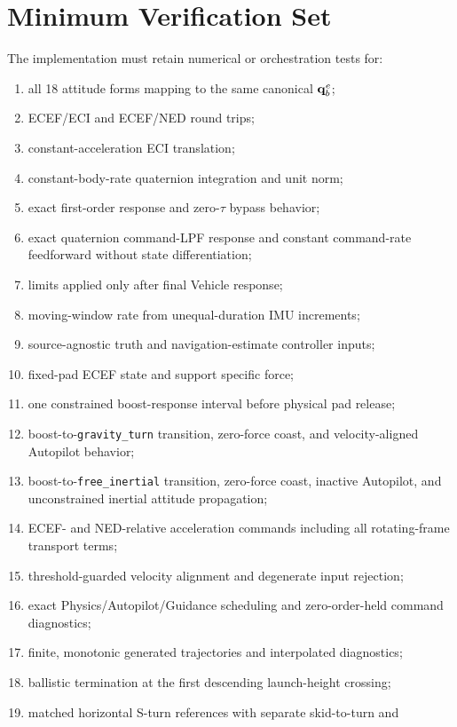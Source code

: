 \section{Minimum Verification Set}

The implementation must retain numerical or orchestration tests for:
\begin{enumerate}
    \item all 18 attitude forms mapping to the same canonical $\mathbf{q}_b^e$;
    \item ECEF/ECI and ECEF/NED round trips;
    \item constant-acceleration ECI translation;
    \item constant-body-rate quaternion integration and unit norm;
    \item exact first-order response and zero-$\tau$ bypass behavior;
    \item exact quaternion command-LPF response and constant command-rate
          feedforward without state differentiation;
    \item limits applied only after final Vehicle response;
    \item moving-window rate from unequal-duration IMU increments;
    \item source-agnostic truth and navigation-estimate controller inputs;
    \item fixed-pad ECEF state and support specific force;
    \item one constrained boost-response interval before physical pad release;
    \item boost-to-\texttt{gravity\_turn} transition, zero-force coast, and
          velocity-aligned Autopilot behavior;
    \item boost-to-\texttt{free\_inertial} transition, zero-force coast,
          inactive Autopilot, and unconstrained inertial attitude propagation;
    \item ECEF- and NED-relative acceleration commands including all
          rotating-frame transport terms;
    \item threshold-guarded velocity alignment and degenerate input rejection;
    \item exact Physics/Autopilot/Guidance scheduling and zero-order-held
          command diagnostics;
    \item finite, monotonic generated trajectories and interpolated diagnostics;
    \item ballistic termination at the first descending launch-height crossing;
    \item matched horizontal S-turn references with separate skid-to-turn and

\end{enumerate}
